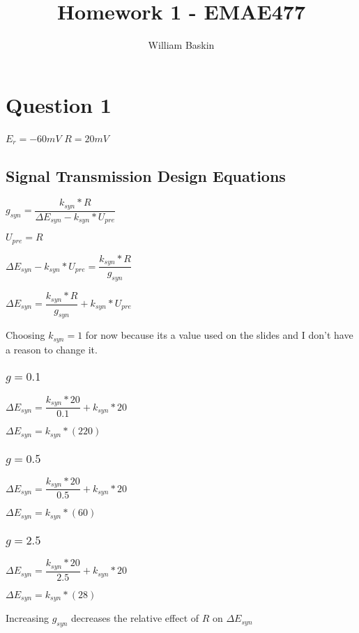 \documentclass[12pt, letterpaper, oneside, notitlepage, onecolumn]{article}
\author{William Baskin}
\title{Homework 1 - EMAE477}
\begin{document}
\maketitle

\section*{Question 1}


$E_{r} = -60mV$
$R = 20mV$

\subsection{Signal Transmission Design Equations}

$g_{syn} = \dfrac{k_{syn} * R}{\Delta E_{syn} - k_{syn} * U_{pre}}$

$U_{pre} = R$

$\Delta E_{syn} - k_{syn} * U_{pre} = \dfrac{k_{syn} * R}{g_{syn}}$

$\Delta E_{syn} = \dfrac{k_{syn} * R}{g_{syn}} + k_{syn} * U_{pre}$

Choosing $k_{syn} = 1$ for now because its a value used on the slides and I
don't have a reason to change it. 

\subsubsection{$g = 0.1$}

$\Delta E_{syn} = \dfrac{k_{syn} * 20}{0.1} + k_{syn} * 20$

$\Delta E_{syn} = k_{syn} * (220)$

\subsubsection{$g = 0.5$}

$\Delta E_{syn} = \dfrac{k_{syn} * 20}{0.5} + k_{syn} * 20$

$\Delta E_{syn} = k_{syn} * (60)$

\subsubsection{$g = 2.5$}

$\Delta E_{syn} = \dfrac{k_{syn} * 20}{2.5} + k_{syn} * 20$

$\Delta E_{syn} = k_{syn} * (28)$

Increasing $g_{syn}$ decreases the relative effect of $R$ on $\Delta E_{syn}$
\end{document}
